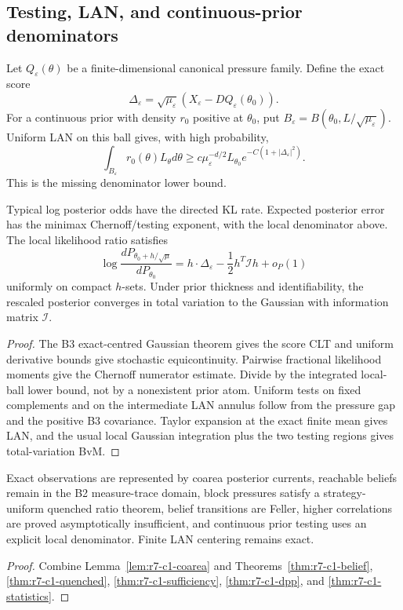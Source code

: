 \subsection{Testing, LAN, and continuous-prior denominators}

Let $Q_\varepsilon(\theta)$ be a finite-dimensional canonical pressure family.
Define the exact score
\[
 \Delta_\varepsilon
 =\sqrt{\mu_\varepsilon}
  (X_\varepsilon-DQ_\varepsilon(\theta_0)).
\]
For a continuous prior with density $r_0$ positive at $\theta_0$, put
$B_\varepsilon=B(\theta_0,L/\sqrt{\mu_\varepsilon})$.  Uniform LAN on this
ball gives, with high probability,
\[
 \int_{B_\varepsilon}r_0(\theta)L_\theta d\theta
 \ge c\mu_\varepsilon^{-d/2}L_{\theta_0}
 e^{-C(1+|\Delta_\varepsilon|^2)}.
\]
This is the missing denominator lower bound.

\begin{theorem}
\label{thm:r7-c1-statistics}
Typical log posterior odds have the directed KL rate.  Expected posterior error
has the minimax Chernoff/testing exponent, with the local denominator above.
The local likelihood ratio satisfies
\[
 \log\frac{dP_{\theta_0+h/\sqrt\mu}}{dP_{\theta_0}}
 =h\cdot\Delta_\varepsilon
 -\frac12h^T\mathcal I h+o_{P}(1)
\]
uniformly on compact $h$-sets.  Under prior thickness and identifiability, the
rescaled posterior converges in total variation to the Gaussian with
information matrix $\mathcal I$.
\end{theorem}

\begin{proof}
The B3 exact-centred Gaussian theorem gives the score CLT and uniform derivative
bounds give stochastic equicontinuity.  Pairwise fractional likelihood moments
give the Chernoff numerator estimate.  Divide by the integrated local-ball
lower bound, not by a nonexistent prior atom.  Uniform tests on fixed
complements and on the intermediate LAN annulus follow from the pressure gap
and the positive B3 covariance.  Taylor expansion at the exact finite mean
gives LAN, and the usual local Gaussian integration plus the two testing
regions gives total-variation BvM.
\end{proof}

\begin{theorem}
\label{thm:r7-c1-main}
Exact observations are represented by coarea posterior currents, reachable
beliefs remain in the B2 measure-trace domain, block pressures satisfy a
strategy-uniform quenched ratio theorem, belief transitions are Feller,
higher correlations are proved asymptotically insufficient, and continuous
prior testing uses an explicit local denominator.  Finite LAN centering remains
exact.
\end{theorem}

\begin{proof}
Combine Lemma~\ref{lem:r7-c1-coarea} and
Theorems~\ref{thm:r7-c1-belief},
\ref{thm:r7-c1-quenched},
\ref{thm:r7-c1-sufficiency},
\ref{thm:r7-c1-dpp}, and
\ref{thm:r7-c1-statistics}.
\end{proof}
